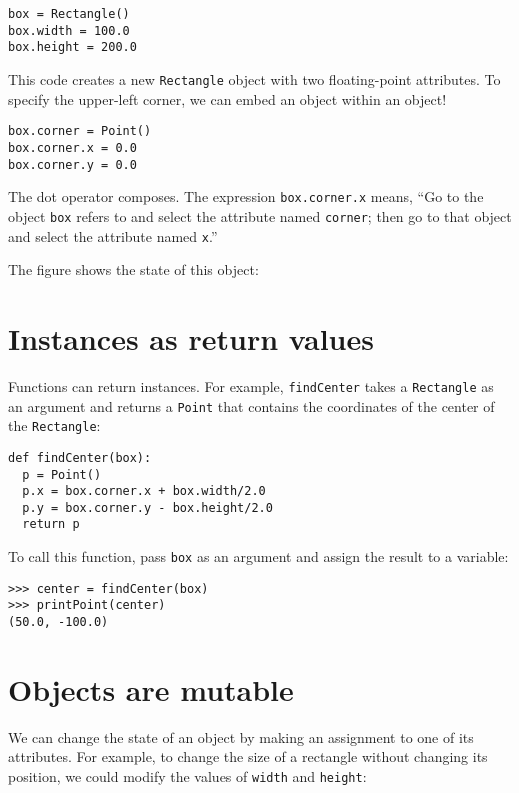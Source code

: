 \beforeverb
\begin{verbatim}
box = Rectangle()
box.width = 100.0
box.height = 200.0
\end{verbatim}
\afterverb
%
This code creates a new {\tt Rectangle} object with two floating-point
attributes.  To specify the upper-left corner, we can embed an
object within an object!

\beforeverb
\begin{verbatim}
box.corner = Point()
box.corner.x = 0.0
box.corner.y = 0.0
\end{verbatim}
\afterverb
%
The dot operator composes.  The expression {\tt box.corner.x} means,
``Go to the object {\tt box} refers to and select the attribute named
{\tt corner}; then go to that object and select the attribute named
{\tt x}.''

The figure shows the state of this object:

\beforefig
\centerline{}
\afterfig


\section{Instances as return values}

Functions can return instances.  For example, {\tt findCenter}
takes a {\tt Rectangle} as an argument and returns a {\tt Point}
that contains the coordinates of the center of the {\tt Rectangle}:

\beforeverb
\begin{verbatim}
def findCenter(box):
  p = Point()
  p.x = box.corner.x + box.width/2.0
  p.y = box.corner.y - box.height/2.0
  return p
\end{verbatim}
\afterverb
%
To call this function, pass {\tt box} as an argument and assign
the result to a variable:

\beforeverb
\begin{verbatim}
>>> center = findCenter(box)
>>> printPoint(center)
(50.0, -100.0)
\end{verbatim}
\afterverb
%

\section{Objects are mutable}

We can change the state of an object by making an assignment
to one of its attributes.  For example, to change the size
of a rectangle without changing its position, we could
modify the values of {\tt width} and {\tt height}:

